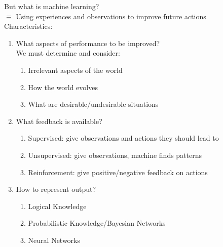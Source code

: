 \documentclass[../../lecture_notes.tex]{subfiles}
\begin{document}
\noindent But what is machine learning?\\
\indent $\equiv$ Using experiences and observations to improve future actions\\
\indent Characteristics:
	\begin{enumerate} [itemsep=0mm]
		\item What aspects of performance to be improved?\\
			We must determine and consider:
			\begin{enumerate} [itemsep=0mm]
				\item Irrelevant aspects of the world
				\item How the world evolves
				\item What are desirable/undesirable situations
			\end{enumerate}
		\item What feedback is available?
			\begin{enumerate} [itemsep=0mm]
				\item Supervised: give observations and actions they should lead to
				\item Unsupervised: give observations, machine finds patterns
				\item Reinforcement: give positive/negative feedback on actions
			\end{enumerate}
		\item How to represent output?
			\begin{enumerate} [itemsep=0mm]
				\item Logical Knowledge
				\item Probabilistic Knowledge/Bayesian Networks
				\item Neural Networks
			\end{enumerate}
	\end{enumerate} \medskip
	
\end{document}
